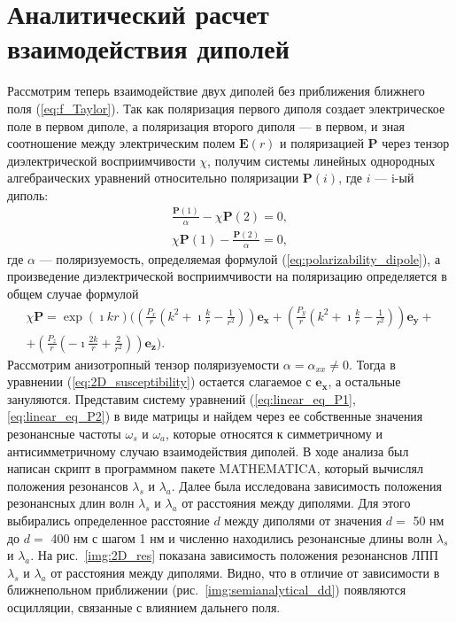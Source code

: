 \section{Аналитический расчет взаимодействия диполей}
Рассмотрим теперь взаимодействие двух диполей без приближения ближнего поля (\ref{eq:f_Taylor}). Так как поляризация первого диполя создает электрическое поле в первом диполе, а поляризация второго диполя --- в первом, и зная соотношение между электрическим полем $ \textbf{E} (r) $ и поляризацией $ \textbf{P} $ через тензор диэлектрической восприимчивости $ \chi $, получим системы линейных однородных алгебраических уравнений относительно поляризации $ \textbf{P} (i) $, где $ i $ --- i-ый диполь:
\begin{subequations}
\begin{gather}
\frac{\textbf{P}(1)}{\alpha} - \chi \textbf{P}(2) = 0, \label{eq:linear_eq_P1} \\
\chi \textbf{P}(1) -  \frac{\textbf{P}(2)}{\alpha} = 0, \label{eq:linear_eq_P2} 
\end{gather}
\end{subequations}
где $ \alpha $ --- поляризуемость, определяемая формулой (\ref{eq:polarizability_dipole}), а произведение диэлектрической восприимчивости на поляризацию определяется в общем случае формулой
\begin{multline}
\chi \textbf{P} = \exp (\imath k r) \Bigg( \left( \frac{P_x}{r} \left( k^2 + \imath \frac{k}{r} - \frac{1}{r^2} \right) \right) \mathbf{e_x} + \left( \frac{P_y}{r} \left( k^2 + \imath \frac{k}{r} - \frac{1}{r^2} \right) \right) \mathbf{e_y} + \\
+ \left( \frac{P_z}{r} \left( - \imath \frac{2 k}{r} + \frac{2}{r^2} \right) \right) \mathbf{e_z} \Bigg).
\label{eq:2D_susceptibility}
\end{multline}
Рассмотрим анизотропный тензор поляризуемости $ \alpha = \alpha_{xx} \neq 0 $. Тогда в уравнении (\ref{eq:2D_susceptibility}) остается слагаемое с $ \mathbf{e_x} $, а остальные зануляются. Представим систему уравнений (\ref{eq:linear_eq_P1}, \ref{eq:linear_eq_P2}) в виде матрицы и найдем через ее собственные значения резонансные частоты $ \omega_s $ и $ \omega_a $, которые относятся к симметричному и антисимметричному случаю взаимодействия диполей. В ходе анализа был написан скрипт в программном пакете MATHEMATICA, который вычислял положения резонансов $ \lambda_s $ и $ \lambda_a $. Далее была исследована зависимость положения резонансных длин волн $ \lambda_s $ и $ \lambda_a $ от расстояния между диполями. Для этого выбирались определенное расстояние $ d $ между диполями от значения $ d = $ 50 нм до $ d = $ 400 нм с шагом 1 нм и численно находились резонансные длины волн  $ \lambda_s $ и $ \lambda_a $. На рис.~\ref{img:2D_res} показана зависимость положения резонанснов ЛПП $ \lambda_s $ и $ \lambda_a $ от расстояния между диполями. Видно, что в отличие от зависимости в ближнепольном приближении (рис.~\ref{img:semianalytical_dd}) появляются осцилляции, связанные с влиянием дальнего поля.
